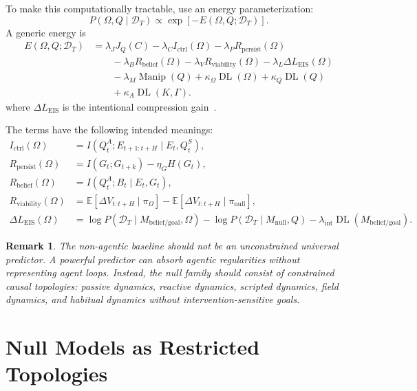 \documentclass[11pt]{article}
\newtheorem{remark}{Remark}
\newcommand{\D}{\mathcal D}
\newcommand{\Expect}{\mathbb E}
\newcommand{\MI}{I}
\newcommand{\DL}{\operatorname{DL}}
\begin{document}
To make this computationally tractable, use an energy parameterization:
\[
    P(\Omega,Q\mid \D_T)
    \propto
    \exp[-E(\Omega,Q;\D_T)].
\]
A generic energy is
\begin{align}
    E(\Omega,Q;\D_T)
    &=
    \lambda_J J_Q(C)
    -\lambda_C I_{\mathrm{ctrl}}(\Omega)
    -\lambda_P R_{\mathrm{persist}}(\Omega)
    \nonumber\\
    &\qquad
    -\lambda_B R_{\mathrm{belief}}(\Omega)
    -\lambda_V R_{\mathrm{viability}}(\Omega)
    -\lambda_L \Delta L_{\mathrm{EIS}}(\Omega)
    \nonumber\\
    &\qquad
    -\lambda_M \operatorname{Manip}(Q)
    +\kappa_\Omega \DL(\Omega)
    +\kappa_Q \DL(Q)
    \nonumber\\
    &\qquad
    +\kappa_A \DL(K,\Gamma).
    \label{eq:energy}
\end{align}
where $\Delta L_{\mathrm{EIS}}$ is the intentional compression gain~\cite{eis2025}.

The terms have the following intended meanings:
\begin{align}
    I_{\mathrm{ctrl}}(\Omega)
    &=
    \MI(Q^A_t;E_{t+1:t+H}\mid E_t,Q^S_t),
    \\
    R_{\mathrm{persist}}(\Omega)
    &=
    \MI(G_t;G_{t+k})-\eta_G H(G_t),
    \\
    R_{\mathrm{belief}}(\Omega)
    &=
    \MI(Q^A_t;B_t\mid E_t,G_t),
    \\
    R_{\mathrm{viability}}(\Omega)
    &=
    \Expect[\Delta V_{t:t+H}\mid \pi_\Omega]
    -
    \Expect[\Delta V_{t:t+H}\mid \pi_{\mathrm{null}}],
    \\
    \Delta L_{\mathrm{EIS}}(\Omega)
    &=
    \log P(\D_T\mid M_{\mathrm{belief/goal}},\Omega)
    -
    \log P(\D_T\mid M_{\mathrm{null}},Q)
    -
    \lambda_{\mathrm{int}}\DL(M_{\mathrm{belief/goal}}).
\end{align}

\begin{remark}
The non-agentic baseline should not be an unconstrained universal predictor.
A powerful predictor can absorb agentic regularities without representing agent
loops. Instead, the null family should consist of constrained causal topologies:
passive dynamics, reactive dynamics, scripted dynamics, field dynamics, and
habitual dynamics without intervention-sensitive goals.
\end{remark}

\section{Null Models as Restricted Topologies}
\end{document}
